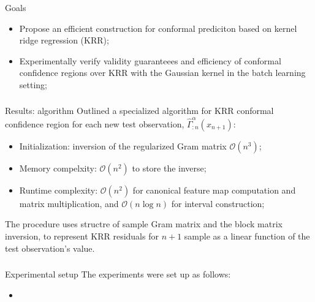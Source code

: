 \documentclass[t]{beamer}  %
\newcommand{\Ocal}{\mathcal{O}}
\begin{document}
\begin{frame}[c]\frametitle{\insertsection}
  \begin{block}{Goals}
    \begin{itemize}
      \item Propose an efficient construction for conformal prediciton based on
      kernel ridge regression (KRR);
      \item Experimentally verify validity guaranteees and efficiency of conformal
      confidence regions over KRR with the Gaussian kernel in the batch learning
      setting;
    \end{itemize}
  \end{block}
\end{frame}

\begin{frame}[c]\frametitle{\insertsection}
  \begin{block}{Results: algorithm}
    Outlined a specialized algorithm for KRR conformal confidence region for each
    new test observation, $\hat{\Gamma}^\alpha_{:n}(x_{n+1})$:
    \begin{itemize}
      \item Initialization: inversion of the regularized Gram matrix $\Ocal(n^3)$;
      \item Memory compelxity: $\mathcal{O}(n^2)$ to store the inverse;
      \item Runtime complexity: $\Ocal(n^2)$ for canonical feature map computation
      and matrix multiplication, and $\Ocal(n \log n)$ for interval construction;
    \end{itemize}

    The procedure uses structre of sample Gram matrix and the block matrix inversion,
    to represent KRR residuals for $n+1$ sample as a linear function of the test
    observation's value.
  \end{block}
\end{frame}

\begin{frame}[c]\frametitle{\insertsection}
  \begin{block}{Experimental setup}
    The experiments were set up as follows: \begin{itemize}
      \item 
    \end{itemize}
  \end{block}
\end{frame}
\end{document}
